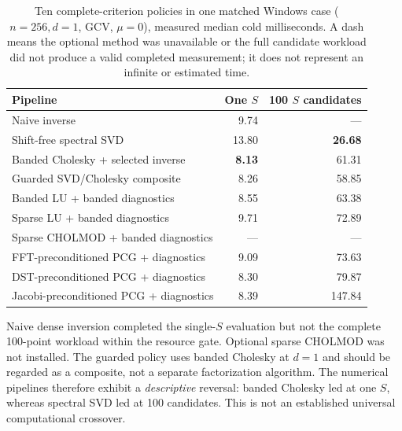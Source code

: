 \begin{table}[t]\centering
\caption{Ten complete-criterion policies in one matched Windows
case ($n=256,d=1$, GCV, $\mu=0$), measured median cold milliseconds.
A dash means the optional method was unavailable or the full
candidate workload did not produce a valid completed measurement;
it does not represent an infinite or estimated time.}
\label{tab:experiment010_methods}
\begin{tabular}{@{}p{}rr@{}}
\toprule
Pipeline & One $S$ & 100 $S$ candidates\\
\midrule
Naive inverse & 9.74 & ---\\
Shift-free spectral SVD & 13.80 & \textbf{26.68}\\
Banded Cholesky + selected inverse & \textbf{8.13} & 61.31\\
Guarded SVD/Cholesky composite & 8.26 & 58.85\\
Banded LU + banded diagnostics & 8.55 & 63.38\\
Sparse LU + banded diagnostics & 9.71 & 72.89\\
Sparse CHOLMOD + banded diagnostics & --- & ---\\
FFT-preconditioned PCG + diagnostics & 9.09 & 73.63\\
DST-preconditioned PCG + diagnostics & 8.30 & 79.87\\
Jacobi-preconditioned PCG + diagnostics & 8.39 & 147.84\\
\bottomrule
\end{tabular}
\end{table}

Naive dense inversion completed the single-$S$ evaluation but not
the complete 100-point workload within the resource gate.
Optional sparse CHOLMOD was not installed. The guarded policy
uses banded Cholesky at $d=1$ and should be regarded as a composite,
not a separate factorization algorithm. The numerical pipelines
therefore exhibit a \emph{descriptive} reversal: banded Cholesky
led at one $S$, whereas spectral SVD led at 100 candidates.
This is not an established universal computational crossover.

